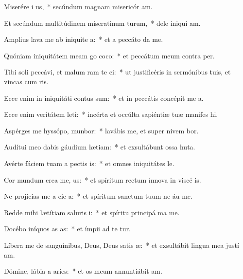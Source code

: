 \item Miserére i us,~* secúndum magnam misericór am.
\item Et secúndum multitúdinem miseratinum turum,~* dele iniqui am.
\item Amplius lava me ab iniquite a:~* et a peccáto  da me.
\item Quóniam iniquitátem meam go coco:~* et peccátum meum contra   per.
\item Tibi soli peccávi, et malum ram te ci:~* ut justificéris in sermónibus tuis, et vincas cum ris.
\item Ecce enim in iniquitáti contus sum:~* et in peccátis concépit me  a.
\item Ecce enim veritátem leti:~* incérta et occúlta sapiéntiæ tuæ manifes hi.
\item Aspérges me hyssópo,  munbor:~* lavábis me, et super nivem bor.
\item Audítui meo dabis gáudium  lætiam:~* et exsultábunt ossa huta.
\item Avérte fáciem tuam a pectis is:~* et omnes iniquitátes  le.
\item Cor mundum crea  me, us:~* et spíritum rectum ínnova in viscé is.
\item Ne projícias me a cie a:~* et spíritum sanctum tuum ne áu  me.
\item Redde mihi lætítiam saluris i:~* et spíritu principá ma me.
\item Docébo iníquos as as:~* et ímpii ad te tur.
\item Líbera me de sanguínibus, Deus, Deus satis æ:~* et exsultábit lingua mea justí am.
\item Dómine, lábia a aries:~* et os meum annuntiábit  am.
